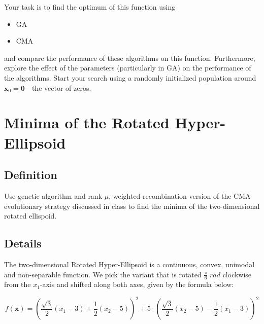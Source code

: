 \documentclass[11pt]{article}
\begin{document}
Your task is to find the optimum of this function using
\begin{itemize}
\item GA
\item CMA
\end{itemize}
and compare the performance of these algorithms on this function.
Furthermore, explore the effect of the parameters (particularly in GA) on the
performance of the algorithms. Start your search using a randomly initialized population around \(\mathbf{x}_0 = \mathbf{0}\)---the vector of zeros.
\section{Minima of the Rotated Hyper-Ellipsoid}
\label{sec:org27d6940}
\subsection{Definition}
\label{sec:org1344c1a}
  Use genetic algorithm and rank-\(\mu\), weighted recombination version of the CMA
evolutionary strategy discussed in class to find the minima of the
two-dimensional rotated ellispoid.
\subsection{Details}
\label{sec:orge64b6d1}
The two-dimensional Rotated Hyper-Ellipsoid is a continuous, convex, unimodal
and non-separable function. We pick the variant that is rotated \(\frac{\pi}{6} \; \si{rad}\) clockwise from the \(x_1\)-axis and shifted along
both axes, given by the formula below:

\begin{equation}
f(\mathbf{x}) = \left( \dfrac{\sqrt{3}}{2} (x_1 - 3) + \dfrac{1}{2} (x_2 - 5) \right)^2 + 5 \cdot \left(  \dfrac{\sqrt{3}}{2} (x_2 - 5) - \dfrac{1}{2} (x_1 - 3)  \right)^2
\end{equation}
\end{document}
